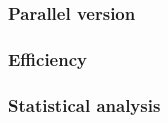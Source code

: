 %



%
%
%
%

\subsubsection*{Parallel version}
\subsubsection*{Efficiency} 
\subsubsection*{Statistical analysis}